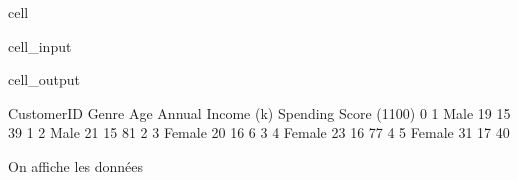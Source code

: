\documentclass[letterpaper,10pt,french]{sphinxmanual}
\begin{document}
\begin{sphinxuseclass}{cell}
\begin{sphinxuseclass}{cell_input}
\begin{sphinxVerbatim}[commandchars=\\\{\}]
   
  
\end{sphinxVerbatim}

\end{sphinxuseclass}
\begin{sphinxuseclass}{cell_output}
\begin{sphinxVerbatim}[commandchars=\\\{\}]
   CustomerID   Genre  Age  Annual Income (k\PYGZdl{})  Spending Score (1\PYGZhy{}100)
0           1    Male   19                  15                      39
1           2    Male   21                  15                      81
2           3  Female   20                  16                       6
3           4  Female   23                  16                      77
4           5  Female   31                  17                      40
\end{sphinxVerbatim}

\end{sphinxuseclass}
\end{sphinxuseclass}
\sphinxAtStartPar
On affiche les données
\end{document}
